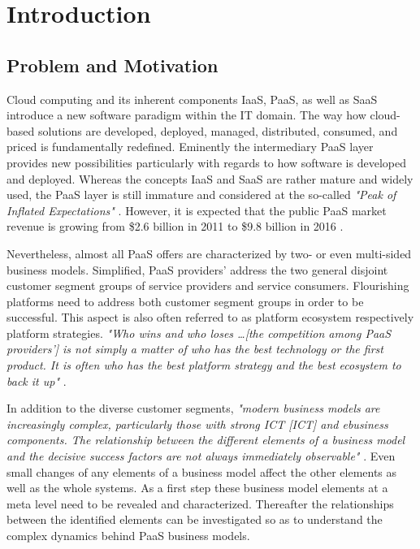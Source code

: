\chapter{Introduction}\label{ch:intro}

\section{Problem and Motivation}\label{ch:intro:mo}


Cloud computing and its inherent components \acf{IaaS}, \acf{PaaS}, as well as \acf{SaaS} introduce a new software paradigm within the \acf{IT} domain. The way how cloud-based solutions are developed, deployed, managed, distributed, consumed, and priced is fundamentally redefined. Eminently the intermediary \ac{PaaS} layer provides new possibilities particularly with regards to how software is developed and deployed. Whereas the concepts \ac{IaaS} and \ac{SaaS} are rather mature and widely used, the \ac{PaaS} layer is still immature and considered at the so-called \textit{"Peak of Inflated Expectations"} \citep[p. 5]{Smith2012}. However, it is expected that the public \ac{PaaS} market revenue is growing from \$2.6 billion in 2011 to \$9.8 billion in 2016 \citep[p. 22]{Hendrick2012a}.

Nevertheless, almost all \ac{PaaS} offers are characterized by two- or even multi-sided business models. Simplified, \ac{PaaS} providers' address the two general disjoint customer segment groups of service providers and service consumers. Flourishing platforms need to address both customer segment groups in order to be successful. This aspect is also often referred to as platform ecosystem respectively platform strategies. \textit{"Who wins and who loses \ldots [the competition among \ac{PaaS} providers'] is not simply a matter of who has the best technology or the first product. It is often who has the best platform strategy and the best ecosystem to back it up"} \citep[p. 34]{Cusumano2010}.

In addition to the diverse customer segments, \textit{"modern business models are increasingly complex, particularly those with strong ICT [\acl{ICT}] and ebusiness components. The relationship between the different elements of a business model and the decisive success factors are not always immediately observable"} \citep[p. 14]{Osterwalder2005}. Even small changes of any elements of a business model affect the other elements as well as the whole systems. As a first step these business model elements at a meta level need to be revealed and characterized. Thereafter the relationships between the identified elements can be investigated so as to understand the complex dynamics behind \ac{PaaS} business models.

